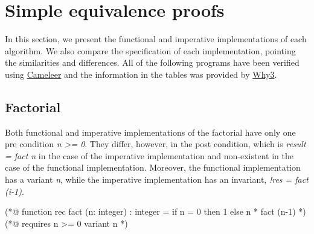 \FloatBarrier
\section{Simple equivalence proofs}
\label{sec:results_eq_proofs}

In this section, we present the functional and imperative implementations of each algorithm.
We also compare the specification of each implementation, pointing the similarities and differences.
All of the following programs have been verified using \hyperref[sec:cameleer]{Cameleer} and the information in the tables was provided by \hyperref[sec:why3]{Why3}.


\subsection{Factorial}
\label{sub:factorial}

Both functional and imperative implementations of the factorial have only one pre condition \emph{n >= 0}.
They differ, however, in the post condition, which is \emph{result = fact n} in the case of the imperative implementation and non-existent in the case of the functional implementation.
Moreover, the functional implementation has a variant \emph{n}, while the imperative implementation has an invariant, \emph{!res = fact (i-1)}. 

\bigskip
\newcommand{\provername}[1]{\cellcolor{yellow!25}
\begin{sideways}\textbf{#1}~~\end{sideways}}
\newcommand{\explanation}[1]{\cellcolor{yellow!13}lemma \texttt{#1}}
\newcommand{\transformation}[1]{\cellcolor{yellow!13}transformation \texttt{#1}}
\newcommand{\subgoal}[2]{\cellcolor{yellow!13}subgoal #2}
\newcommand{\valid}[1]{\cellcolor{green!13}#1}
\newcommand{\unknown}[1]{\cellcolor{red!20}#1}
\newcommand{\invalid}[1]{\cellcolor{red!50}#1}
\newcommand{\timeout}[1]{\cellcolor{red!20}(#1)}
\newcommand{\outofmemory}[1]{\cellcolor{red!20}(#1)}
\newcommand{\noresult}{\multicolumn{1}{>{\columncolor[gray]{0.8}}c|}{~}}
\newcommand{\highfailure}{\cellcolor{red!50}FAILURE}
    
\begin{minipage}{\linewidth}
\begin{gospel}
  (*@ function rec fact (n: integer) : integer =
  if n = 0 then 1 else n * fact (n-1) *)
  (*@ requires n >= 0 
    variant n *)
\end{gospel}
\end{minipage}

